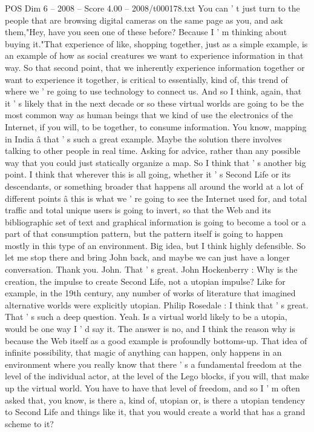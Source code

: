 \begin{textsample}{POS Dim 6 – 2008 – Score 4.00 – 2008/t000178.txt}
You can ' t just turn to the people that are browsing digital cameras on the same page as you, and ask them,"Hey, have you seen one of these before?
Because I ' m thinking about buying it."That experience of like, shopping together, just as a simple example, is an example of how as social creatures we want to experience information in that way.
So that second point, that we inherently experience information together or want to experience it together, is critical to essentially, kind of, this trend of where we ' re going to use technology to connect us.
And so I think, again, that it ' s likely that in the next decade or so these virtual worlds are going to be the most common way as human beings that we kind of use the electronics of the Internet, if you will, to be together, to consume information.
You know, mapping in India â that ' s such a great example.
Maybe the solution there involves talking to other people in real time.
Asking for advice, rather than any possible way that you could just statically organize a map.
So I think that ' s another big point.
I think that wherever this is all going, whether it ' s Second Life or its descendants, or something broader that happens all around the world at a lot of different points â this is what we ' re going to see the Internet used for, and total traffic and total unique users is going to invert, so that the Web and its bibliographic set of text and graphical information is going to become a tool or a part of that consumption pattern, but the pattern itself is going to happen mostly in this type of an environment.
Big idea, but I think highly defensible.
So let me stop there and bring John back, and maybe we can just have a longer conversation.
Thank you.
John.
That ' s great.
John Hockenberry : Why is the creation, the impulse to create Second Life, not a utopian impulse?
Like for example, in the 19th century, any number of works of literature that imagined alternative worlds were explicitly utopian.
Philip Rosedale : I think that ' s great.
That ' s such a deep question.
Yeah.
Is a virtual world likely to be a utopia, would be one way I ' d say it.
The answer is no, and I think the reason why is because the Web itself as a good example is profoundly bottoms-up.
That idea of infinite possibility, that magic of anything can happen, only happens in an environment where you really know that there ' s a fundamental freedom at the level of the individual actor, at the level of the Lego blocks, if you will, that make up the virtual world.
You have to have that level of freedom, and so I ' m often asked that, you know, is there a, kind of, utopian or, is there a utopian tendency to Second Life and things like it, that you would create a world that has a grand scheme to it?

\end{textsample}
